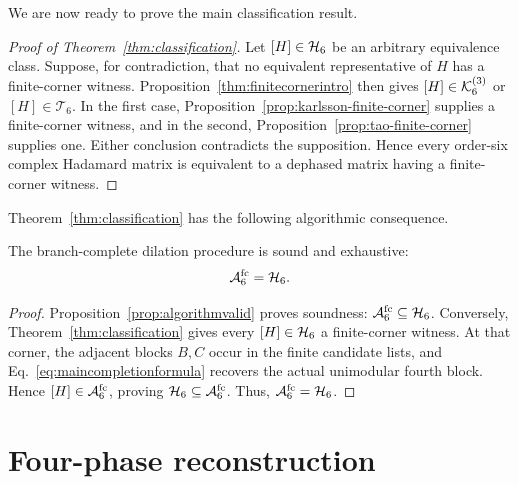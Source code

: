 We are now ready to prove the main classification result.

\begin{proof}[Proof of Theorem~\ref{thm:classification}]
Let $[H]\in\mathcal H_6$ be an arbitrary equivalence class. Suppose, for contradiction, that no equivalent representative of $H$ has a finite-corner witness. Proposition~\ref{thm:finitecornerintro} then gives $[H]\in\mathcal K_6^{(3)}$ or $[H]\in\mathcal T_6$. In the first case, Proposition~\ref{prop:karlsson-finite-corner} supplies a finite-corner witness, and in the second, Proposition~\ref{prop:tao-finite-corner} supplies one. Either conclusion contradicts the supposition. Hence every order-six complex Hadamard matrix is equivalent to a dephased matrix having a finite-corner witness.
\end{proof}

Theorem~\ref{thm:classification} has the following algorithmic consequence.

\begin{corollary}
\label{cor:atlas-classification}
The branch-complete dilation procedure is sound and exhaustive:
\begin{equation}
\mathcal A_6^{\mathrm{fc}}=\mathcal H_6.
\label{eq:completeclassification}
\end{equation}
\end{corollary}

\begin{proof}
Proposition~\ref{prop:algorithmvalid} proves soundness: $\mathcal A_6^{\mathrm{fc}}\subseteq\mathcal H_6$. Conversely, Theorem~\ref{thm:classification} gives every $[H]\in\mathcal H_6$ a finite-corner witness. At that corner, the adjacent blocks $B,C$ occur in the finite candidate lists, and Eq.~\eqref{eq:maincompletionformula} recovers the actual unimodular fourth block. Hence
$[H]\in\mathcal A_6^{\mathrm{fc}}$, proving
$\mathcal H_6\subseteq\mathcal A_6^{\mathrm{fc}}$. Thus, $\mathcal A_6^{\mathrm{fc}}=\mathcal H_6$.
\end{proof}

\section{Four-phase reconstruction}
\label{sec:finite-corner-reconstruction-space}
\label{sec:atlas}

